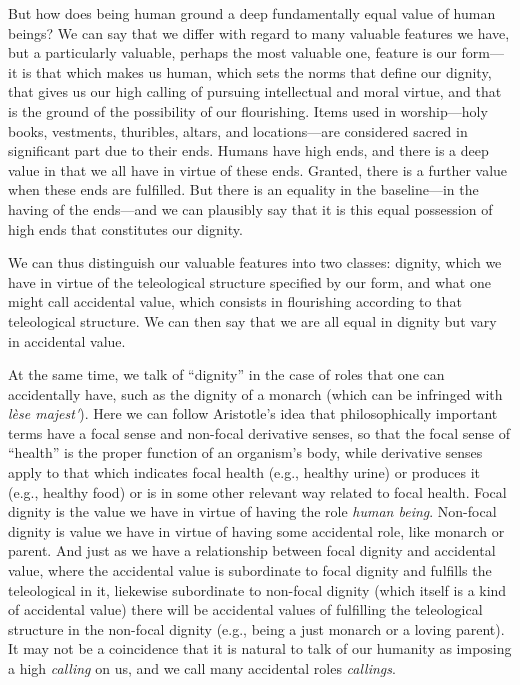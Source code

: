 But how does being human ground a deep fundamentally equal value of human beings? We can say that we differ with regard 
to many valuable features we have, but a particularly valuable, perhaps the most valuable one, feature is our form---it is 
that which makes us human, which sets the norms that define our dignity, that gives us our high calling of pursuing intellectual and moral virtue, and 
that is the ground of the possibility of our flourishing. Items used in  worship---holy books, vestments, thuribles, 
altars, and locations---are considered sacred in significant part due to their ends. Humans have high ends, and there is a
deep value in that we all have in virtue of these ends. Granted, there is a further value when these ends are fulfilled. 
But there is an equality in the baseline---in the having of the ends---and we can plausibly say that it is this equal
possession of high ends that constitutes our dignity. 

We can thus distinguish our valuable features into two classes: dignity, which we have in virtue of the teleological structure
specified by our form, and what one might call accidental value, which consists in flourishing according to that teleological structure.
We can then say that we are all equal in dignity but vary in accidental value. 

At the same time, we talk of ``dignity'' in the case of roles that one can accidentally have, such as the dignity of a monarch
(which can be infringed with \textit{l\`ese majest\'}). Here we can follow Aristotle's idea that philosophically important terms have a 
focal sense and non-focal derivative senses, so that the focal sense of ``health'' is the proper function of an organism's body, 
while derivative senses apply to that which indicates focal health (e.g., healthy urine) or produces it (e.g., healthy food) or is in
some other relevant way related to focal health. Focal dignity is the value we have in virtue of having the role \textit{human being}.
Non-focal dignity is value we have in virtue of having some accidental role, like monarch or parent. And just as we have a relationship
between focal dignity and accidental value, where the accidental value is subordinate to focal dignity and fulfills the teleological 
in it, liekewise subordinate to non-focal dignity (which itself is a kind of accidental value) there will be accidental values of
fulfilling the teleological structure in the non-focal dignity (e.g., being a just monarch or a loving parent). It may not be a 
coincidence that it is natural to talk of our humanity as imposing a high \textit{calling} on us, and we call many accidental roles
\textit{callings}.

